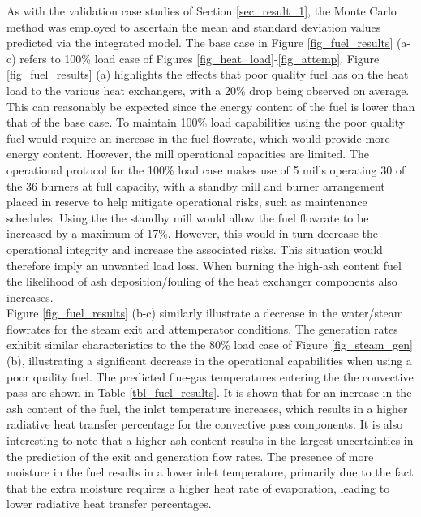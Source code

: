 \documentclass[a4paper,fleqn]{cas-dc}
\begin{document}
As with the validation case studies of Section \ref{sec_result_1}, the Monte Carlo method was employed to ascertain the mean and standard deviation values predicted via the integrated model. The base case in Figure \ref{fig_fuel_results} (a-c) refers to 100\% load case of Figures \ref{fig_heat_load}-\ref{fig_attemp}. Figure \ref{fig_fuel_results}  (a) highlights the effects that poor quality fuel has on the heat load to the various heat exchangers, with a 20\% drop being observed on average. This can reasonably be expected since the energy content of the fuel is lower than that of the base case. To maintain 100\% load capabilities using the poor quality fuel would require an increase in the fuel flowrate, which would provide more energy content. However, the mill operational capacities are limited. The operational protocol for the 100\% load case makes use of 5 mills operating 30 of the 36 burners at full capacity, with a standby mill and burner arrangement placed in reserve to help mitigate operational risks, such as maintenance schedules. Using the the standby mill would allow the fuel flowrate to be increased by a maximum of 17\%. However, this would in turn decrease the operational integrity and increase the associated risks. This situation would therefore imply an unwanted load loss. When burning the high-ash content fuel the likelihood of ash deposition/fouling of the heat exchanger components also increases.\\

Figure \ref{fig_fuel_results} (b-c) similarly illustrate a decrease in the water/steam flowrates for the steam exit and attemperator conditions. The generation rates exhibit similar characteristics to the the 80\% load case of Figure \ref{fig_steam_gen} (b), illustrating a significant decrease in the operational capabilities when using a poor quality fuel. The predicted flue-gas temperatures entering the the convective pass are shown in Table \ref{tbl_fuel_results}. It is shown that for an increase in the ash content of the fuel, the inlet temperature increases, which results in a higher radiative heat transfer percentage for the convective pass components. It is also interesting to note that a higher ash content results in the largest uncertainties in the prediction of the exit and generation flow rates. The presence of more moisture in the fuel results in a lower inlet temperature, primarily due to the fact that the extra moisture requires a higher heat rate of evaporation, leading to lower radiative heat transfer percentages.\\
\end{document}
